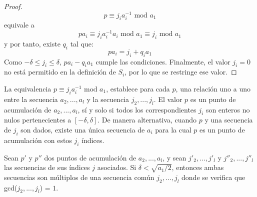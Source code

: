     \begin{proof}
        \begin{equation}
            p \equiv j_{i}a_{i}^{-1} \text{ mod } a_{1}
        \end{equation}
        equivale a
        \begin{equation}
            pa_{i} \equiv j_{i}a_{i}^{-1}a_{i} \text{ mod } a_{1} \equiv j_{i} \text{ mod } a_{1}
        \end{equation}
        y por tanto, existe $q_{i}$ tal que:
        \begin{equation}
            pa_{i} = j_{i} + q_{i}a_{1}
        \end{equation}
        Como $-\delta \leq j_{i} \leq \delta$, $pa_{i}-q_{i}a_{1}$ cumple las condiciones. Finalmente, el valor $j_{i} = 0$ no está permitido en la definición de $S_{i}$, por lo que se restringe ese valor.
    \end{proof}

    La equivalencia $p \equiv j_{i}a_{i}^{-1} \text{ mod } a_{1}$, establece para cada $p$, una relación uno a uno entre la secuencia $a_{2}, ... , a_{l}$ y la secuencia $j_{2}, ... , j_{l}$. El valor $p$ es un punto de acumulación de $a_{2}, ... , a_{l}$, sí y solo si todos los correspondientes $j_{i}$ son enteros no nulos pertenecientes a $[-\delta, \delta]$. De manera alternativa, cuando $p$ y una secuencia de $j_{i}$ son dados, existe una única secuencia de $a_{i}$ para la cual $p$ es un punto de acumulación con estos $j_{i}$ índices.

    \begin{lema} \cite{artSha} \label{lem:4.5}
        Sean $p'$ y $p''$ dos puntos de acumulación de $a_{2}, ... , a_{l}$, y sean $j'_{2}, ... , j'_{l}$ y $j''_{2}, ... , j''_{l}$ las secuencias de sus índices $j$ asociados. Si $\delta < \sqrt{a_{1}/2}$, entonces ambas secuencias son múltiplos de una secuencia común $j_{2}, ... , j_{l}$ donde se verifica que gcd($j_{2}, ... , j_{l}$) = $1$.
    \end{lema}

